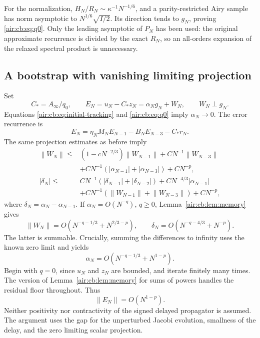\documentclass[11pt,letterpaper]{article}
\numberwithin{equation}{section}
\theoremstyle{remark}
\newcommand{\norm}[1]{\left\lVert#1\right\rVert}
\begin{document}
For the normalization, $H_N/R_N\sim\kappa^{-1}N^{-1/6}$, and a
parity-restricted Airy sample has norm asymptotic to
$N^{1/6}\sqrt{I/2}$. Its direction tends to $g_N$, proving
\eqref{air:cb:eq:q0}. Only the leading asymptotic of $P_N$ has been used:
the original approximate recurrence is divided by the exact $R_N$, so an
all-orders expansion of the relaxed spectral product is unnecessary.

\subsection{A bootstrap with vanishing limiting projection}\label{air:cb:sec:bootstrap}
Set
\begin{equation}\label{air:cb:eq:matching}
C_* = A_\infty/q_0,\qquad E_N=u_N-C_*z_N
=\alpha_Ng_N+W_N,\qquad W_N\perp g_N.
\end{equation}
Equations \eqref{air:cb:eq:initial-tracking} and \eqref{air:cb:eq:q0} imply
$\alpha_N\to0$. The error recurrence is
\[
E_N=\eta_NM_NE_{N-1}-B_NE_{N-3}-C_*r_N.
\]
The same projection estimates as before imply
\begin{equation}\label{air:cb:eq:bootstrap-ineq}
\begin{aligned}
\norm{W_N}\le{}&(1-cN^{-2/3})\norm{W_{N-1}}+CN^{-1}\norm{W_{N-3}}\\
&+CN^{-1}(|\alpha_{N-1}|+|\alpha_{N-3}|)+CN^{-p},\\
|\delta_N|\le{}&CN^{-1}(|\delta_{N-1}|+|\delta_{N-2}|)
+CN^{-4/3}|\alpha_{N-1}|\\
&+CN^{-1}(\norm{W_{N-1}}+\norm{W_{N-3}})+CN^{-p},
\end{aligned}
\end{equation}
where $\delta_N=\alpha_N-\alpha_{N-1}$. If
$\alpha_N=O(N^{-q})$, $q\ge0$, Lemma~\ref{air:cb:lem:memory} gives
\begin{equation}\label{air:cb:eq:bootstrap-powers}
\norm{W_N}=O(N^{-q-1/3}+N^{2/3-p}),\qquad
\delta_N=O(N^{-q-4/3}+N^{-p}).
\end{equation}
The latter is summable. Crucially, summing the differences to infinity uses
the known zero limit and yields
\begin{equation}\label{air:cb:eq:bootstrap-tail}
\alpha_N=O(N^{-q-1/3}+N^{1-p}).
\end{equation}
Begin with $q=0$, since $u_N$ and $z_N$ are bounded, and iterate finitely
many times. The version of Lemma~\ref{air:cb:lem:memory} for sums of powers handles
the residual floor throughout. Thus
\begin{equation}\label{air:cb:eq:arbitrary-error}
\norm{E_N}=O(N^{1-p}).
\end{equation}
Neither positivity nor contractivity of the signed delayed propagator is
assumed. The argument uses the gap for the unperturbed Jacobi evolution,
smallness of the delay, and the zero limiting scalar projection.
\end{document}
